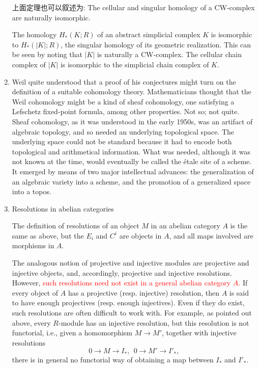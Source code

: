 \documentclass[UTF8]{ctexart}
\begin{document}
\begin{enumerate}
上面定理也可以叙述为: The cellular and singular homology of a CW-complex are naturally isomorphic.

The homology $H_\ast(K;R)$ of an abstract simplicial complex $K$ is isomorphic to $H_\ast(\left|K\right|;R)$, the singular homology of its geometric realization. This can be seen by noting that $\left|K\right|$ is naturally a CW-complex. The cellular chain complex of $\left|K\right|$ is isomorphic to the simplicial chain complex of $K$.

\item \cite{tohoku}Weil quite understood that a proof of his conjectures might turn on the definition of a suitable cohomology theory. Mathematicians thought that the Weil cohomology might be a kind of sheaf cohomology, one satisfying a Lefschetz fixed-point formula, among other properties. Not so; not quite. Sheaf cohomology, as it was understood in the early 1950s, was an artifact of algebraic topology, and so needed an underlying topological space. The underlying space could not be standard because it had to encode both topological and arithmetical information. What was needed, although it was not known at the time, would eventually be called the étale site of a scheme. It emerged by means of two major intellectual advances: the generalization of an algebraic variety into a scheme, and the promotion of a generalized space into a topos.

\item Resolutions in abelian categories

The definition of resolutions of an object $M$ in an abelian category $A$ is the same as above, but the $E_i$ and $C^i$ are objects in $A$, and all maps involved are morphisms in $A$.

The analogous notion of projective and injective modules are projective and injective objects, and, accordingly, projective and injective resolutions. However, \textcolor{red}{such resolutions need not exist in a general abelian category $A$.} If every object of $A$ has a projective (resp. injective) resolution, then $A$ is said to have enough projectives (resp. enough injectives). Even if they do exist, such resolutions are often difficult to work with. For example, as pointed out above, every $R$-module has an injective resolution, but this resolution is not functorial, i.e., given a homomorphism $M \to M'$, together with injective resolutions
\[
0\rightarrow M\rightarrow I_{*},\ \ 0\rightarrow M'\rightarrow I'_{*},
\]
there is in general no functorial way of obtaining a map between $I_{*}$ and $I'_{*}$.
\end{enumerate}



\newpage
\printbibliography
\end{document}
